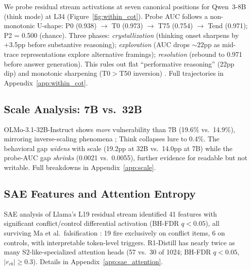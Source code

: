 \documentclass{article}
\newcommand{\stwo}{S2-like}
\begin{document}
We probe residual stream activations at seven canonical positions
for Qwen~3-8B (think mode) at L34 (Figure~\ref{fig:within_cot}).
Probe AUC follows a non-monotonic U-shape: P0 (0.938) $\to$ T0 (0.973)
$\to$ T75 (0.754) $\to$ Tend (0.971); P2 = 0.500 (chance).
Three phases: \emph{crystallization} (thinking onset sharpens by +3.5pp
before substantive reasoning); \emph{exploration} (AUC drops ${\sim}22$pp
as mid-trace representations explore alternative framings); \emph{resolution}
(rebound to 0.971 before answer generation).
This rules out flat ``performative reasoning'' (22pp dip) and monotonic
sharpening (T0$>$T50 inversion) \citep{boppana2026reasoning,jiang2025aha}.
Full trajectories in Appendix~\ref{app:within_cot}.

\subsection{Scale Analysis: 7B vs.\ 32B}
\label{sec:scale}

OLMo-3.1-32B-Instruct shows \emph{more} vulnerability than 7B
(19.6\% vs.\ 14.9\%), mirroring inverse-scaling phenomena
\citep{mckenzie2023inverse, perez2023discovering}; Think collapses
lure to 0.4\%.  The behavioral gap \emph{widens} with scale (19.2pp
at 32B vs.\ 14.0pp at 7B) while the probe-AUC gap \emph{shrinks}
(0.0021 vs.\ 0.0055), further evidence for readable but not writable.
Full breakdowns in Appendix~\ref{app:scale}.

\subsection{SAE Features and Attention Entropy}
\label{sec:results_sae_attention}

SAE analysis of Llama's L19 residual stream identified 41 features with
significant conflict/control differential activation (BH-FDR $q < 0.05$),
all surviving Ma et al.\ falsification \citep{ma2026falsification}: 19
fire exclusively on conflict items, 6 on controls, with interpretable
token-level triggers.  R1-Distill has nearly twice as many
\stwo{}-specialized attention heads (57 vs.\ 30 of 1024; BH-FDR
$q < 0.05$, $|r_{rb}| \geq 0.3$).  Details in
Appendix~\ref{app:sae_attention}.

\end{document}
